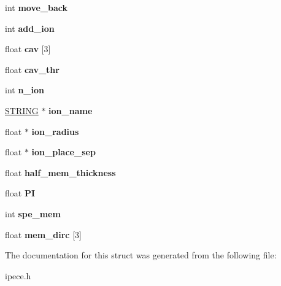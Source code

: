 \begin{DoxyCompactItemize}
\item 
\hypertarget{struct_i_p_e_c_e___p_r_m_a4f9126762e47d975121b69516ba6b8df}{int {\bfseries move\-\_\-back}}\label{struct_i_p_e_c_e___p_r_m_a4f9126762e47d975121b69516ba6b8df}

\item 
\hypertarget{struct_i_p_e_c_e___p_r_m_ac73d2096038914e3c4f098c8c8b142c7}{int {\bfseries add\-\_\-ion}}\label{struct_i_p_e_c_e___p_r_m_ac73d2096038914e3c4f098c8c8b142c7}

\item 
\hypertarget{struct_i_p_e_c_e___p_r_m_a0d368f685391efe21c4b55abbee73c9c}{float {\bfseries cav} \mbox{[}3\mbox{]}}\label{struct_i_p_e_c_e___p_r_m_a0d368f685391efe21c4b55abbee73c9c}

\item 
\hypertarget{struct_i_p_e_c_e___p_r_m_a39fc03d6bc217e07bd05d09b9b420c08}{float {\bfseries cav\-\_\-thr}}\label{struct_i_p_e_c_e___p_r_m_a39fc03d6bc217e07bd05d09b9b420c08}

\item 
\hypertarget{struct_i_p_e_c_e___p_r_m_a875a3c8ca3e9831e1e8456c217aaa99f}{int {\bfseries n\-\_\-ion}}\label{struct_i_p_e_c_e___p_r_m_a875a3c8ca3e9831e1e8456c217aaa99f}

\item 
\hypertarget{struct_i_p_e_c_e___p_r_m_a95db085719266c60df4a8232728e37eb}{\hyperlink{struct_s_t_r_i_n_g}{S\-T\-R\-I\-N\-G} $\ast$ {\bfseries ion\-\_\-name}}\label{struct_i_p_e_c_e___p_r_m_a95db085719266c60df4a8232728e37eb}

\item 
\hypertarget{struct_i_p_e_c_e___p_r_m_a0cbb240f313a9abe0a9f1c0a4a5bb229}{float $\ast$ {\bfseries ion\-\_\-radius}}\label{struct_i_p_e_c_e___p_r_m_a0cbb240f313a9abe0a9f1c0a4a5bb229}

\item 
\hypertarget{struct_i_p_e_c_e___p_r_m_a7679a43e4d95e582d54eb3eb8a8fe59a}{float $\ast$ {\bfseries ion\-\_\-place\-\_\-sep}}\label{struct_i_p_e_c_e___p_r_m_a7679a43e4d95e582d54eb3eb8a8fe59a}

\item 
\hypertarget{struct_i_p_e_c_e___p_r_m_a60e18167eec4d4d8232ce1f07f9d1770}{float {\bfseries half\-\_\-mem\-\_\-thickness}}\label{struct_i_p_e_c_e___p_r_m_a60e18167eec4d4d8232ce1f07f9d1770}

\item 
\hypertarget{struct_i_p_e_c_e___p_r_m_a305d4200ec321dd937a3947d16d62540}{float {\bfseries P\-I}}\label{struct_i_p_e_c_e___p_r_m_a305d4200ec321dd937a3947d16d62540}

\item 
\hypertarget{struct_i_p_e_c_e___p_r_m_a73fdcb2f06ed5967c18bcbdd370d5a95}{int {\bfseries spe\-\_\-mem}}\label{struct_i_p_e_c_e___p_r_m_a73fdcb2f06ed5967c18bcbdd370d5a95}

\item 
\hypertarget{struct_i_p_e_c_e___p_r_m_ac44d1e5d52d8cda7f1d99f126716f745}{float {\bfseries mem\-\_\-dirc} \mbox{[}3\mbox{]}}\label{struct_i_p_e_c_e___p_r_m_ac44d1e5d52d8cda7f1d99f126716f745}

\end{DoxyCompactItemize}


The documentation for this struct was generated from the following file\-:\begin{DoxyCompactItemize}
\item 
ipece.\-h\end{DoxyCompactItemize}
